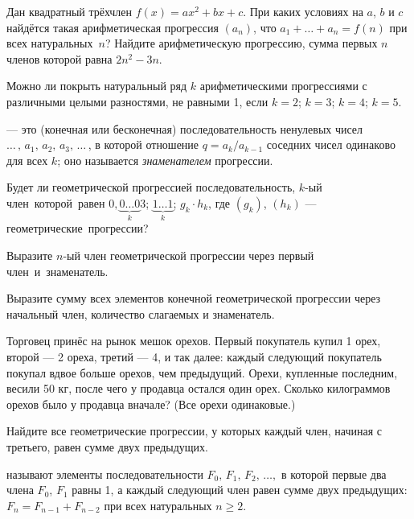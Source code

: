 \documentclass[a4paper,12pt]{article}
\begin{document}
Дан квадратный тр\"ехчлен $f(x)=ax^2+bx+c$.
При каких условиях на $a$, $b$ и $c$ найд\"ется такая арифметическая прогрессия
$(a_n)$, что $a_1+\ldots+a_n=f(n)$ при всех натуральных~$n$?
 Найдите арифметическую прогрессию,
сумма первых $n$ членов которой равна $2n^2-3n$.


Можно ли покрыть натуральный ряд $k$ арифметическими
прогрессиями с различными целыми разностями, не равными 1,
если
 $k=2$;
 $k=3$;
 $k=4$;
 $k=5$.

  --- это (конечная или бесконечная)
последовательность ненулевых чисел $\ldots\,,\,a_1,\,a_2,\,a_3,\,\ldots\,$,
в которой отношение $q=a_k/a_{k-1}$ соседних чисел
одинаково для всех $k$; оно называется {\it знаменателем\/} прогрессии.


Будет ли геометрической прогрессией последовательность, $k$-ый
член~\hbox{которой}~ра\-вен
%
$0,\underbrace{0\ldots0}_{k}3$;
 $\underbrace{1\ldots1}_{k}$;
 $g_k\cdot h_k$, где $(g_k)$, $(h_k)$ --- геометрические~\hbox{прогрессии?}

Выразите $n$-ый член геометрической прогрессии через
первый член~и~\hbox{знаменатель.}



 Выразите сумму
всех элементов конечной геометрической прогрессии через начальный член,
количество слагаемых и знаменатель.


 Торговец прин\"ес на рынок мешок орехов.
Первый покупатель купил 1 орех, второй --- 2 ореха,
третий --- 4, и так далее: каждый следующий покупатель
покупал вдвое больше орехов, чем предыдущий.
Орехи, купленные последним, весили 50 кг, после чего у продавца
остался один орех. Сколько килограммов орехов было у продавца вначале?
(Все орехи одинаковые.)

 Найдите все геометрические прогрессии, у которых каждый член,
начиная с третьего, равен сумме двух предыдущих.

 называют элементы последовательности
$F_0,\,F_1,\,F_2,\,\ldots,$
в которой первые два члена $F_0$, $F_1$ равны 1, а
каждый следующий член равен сумме двух предыдущих:
$F_{n}=F_{n-1}+F_{n-2}$ при всех натуральных $n\geq2$.
\end{document}

